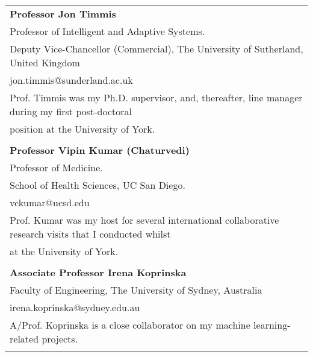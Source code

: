 \documentclass[a4paper]{article}
\begin{document}
\begin{tabular}{l}
\textbf{Professor Jon Timmis} \\
Professor of Intelligent and Adaptive Systems.\\
Deputy Vice-Chancellor (Commercial), The University of Sutherland, United Kingdom\\
jon.timmis@sunderland.ac.uk\\
Prof. Timmis was my Ph.D. supervisor, and, thereafter, line manager during my first post-doctoral\\ position at the University of York.\\
\\

\textbf{Professor Vipin Kumar (Chaturvedi)}\\
Professor of Medicine.\\
School of Health Sciences, UC San Diego.\\
vckumar@ucsd.edu\\
Prof. Kumar was my host for several international collaborative research visits that I conducted whilst\\ at the University of York.\\
\\

 \textbf{Associate Professor Irena Koprinska}\\
 Faculty of Engineering, The University of Sydney, Australia\\
 irena.koprinska@sydney.edu.au\\
 A/Prof. Koprinska is a close collaborator on my machine learning-related projects.\\
 \\

\end{tabular}
\end{document}
